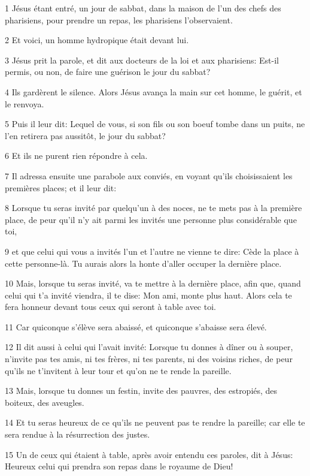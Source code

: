 \par 1 Jésus étant entré, un jour de sabbat, dans la maison de l'un des chefs des pharisiens, pour prendre un repas, les pharisiens l'observaient.
\par 2 Et voici, un homme hydropique était devant lui.
\par 3 Jésus prit la parole, et dit aux docteurs de la loi et aux pharisiens: Est-il permis, ou non, de faire une guérison le jour du sabbat?
\par 4 Ils gardèrent le silence. Alors Jésus avança la main sur cet homme, le guérit, et le renvoya.
\par 5 Puis il leur dit: Lequel de vous, si son fils ou son boeuf tombe dans un puits, ne l'en retirera pas aussitôt, le jour du sabbat?
\par 6 Et ils ne purent rien répondre à cela.
\par 7 Il adressa ensuite une parabole aux conviés, en voyant qu'ils choisissaient les premières places; et il leur dit:
\par 8 Lorsque tu seras invité par quelqu'un à des noces, ne te mets pas à la première place, de peur qu'il n'y ait parmi les invités une personne plus considérable que toi,
\par 9 et que celui qui vous a invités l'un et l'autre ne vienne te dire: Cède la place à cette personne-là. Tu aurais alors la honte d'aller occuper la dernière place.
\par 10 Mais, lorsque tu seras invité, va te mettre à la dernière place, afin que, quand celui qui t'a invité viendra, il te dise: Mon ami, monte plus haut. Alors cela te fera honneur devant tous ceux qui seront à table avec toi.
\par 11 Car quiconque s'élève sera abaissé, et quiconque s'abaisse sera élevé.
\par 12 Il dit aussi à celui qui l'avait invité: Lorsque tu donnes à dîner ou à souper, n'invite pas tes amis, ni tes frères, ni tes parents, ni des voisins riches, de peur qu'ils ne t'invitent à leur tour et qu'on ne te rende la pareille.
\par 13 Mais, lorsque tu donnes un festin, invite des pauvres, des estropiés, des boiteux, des aveugles.
\par 14 Et tu seras heureux de ce qu'ils ne peuvent pas te rendre la pareille; car elle te sera rendue à la résurrection des justes.
\par 15 Un de ceux qui étaient à table, après avoir entendu ces paroles, dit à Jésus: Heureux celui qui prendra son repas dans le royaume de Dieu!
